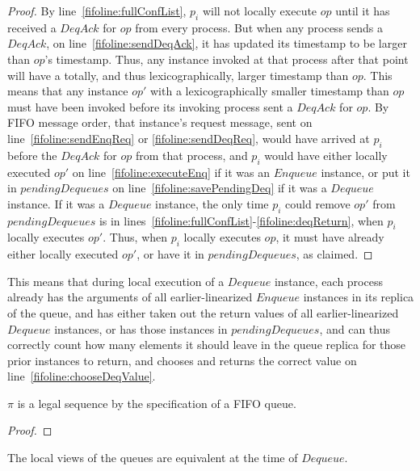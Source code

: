 \documentclass[a4paper,anonymous,USenglish]{lipics-v2021} %
\theoremstyle{definition}
\begin{document}
\begin{proof}
  By line~\ref{fifoline:fullConfList}, $p_i$ will not locally execute $op$ until it has received a $DeqAck$ for $op$ from every process.  But when any process sends a $DeqAck$, on line~\ref{fifoline:sendDeqAck}, it has updated its timestamp to be larger than $op$'s timestamp.  Thus, any instance invoked at that process after that point will have a totally, and thus lexicographically, larger timestamp than $op$.  This means that any instance $op'$ with a lexicographically smaller timestamp than $op$ must have been invoked before its invoking process sent a $DeqAck$ for $op$.  By FIFO message order, that instance's request message, sent on line~\ref{fifoline:sendEnqReq} or \ref{fifoline:sendDeqReq}, would have arrived at $p_i$ before the $DeqAck$ for $op$ from that process, and $p_i$ would have either locally executed $op'$ on line~\ref{fifoline:executeEnq} if it was an $Enqueue$ instance, or put it in $pendingDequeues$ on line~\ref{fifoline:savePendingDeq} if it was a $Dequeue$ instance.  If it was a $Dequeue$ instance, the only time $p_i$ could remove $op'$ from $pendingDequeues$ is in lines~\ref{fifoline:fullConfList}-\ref{fifoline:deqReturn}, when $p_i$ locally executes $op'$.  Thus, when $p_i$ locally executes $op$, it must have already either locally executed $op'$, or have it in $pendingDequeues$, as claimed.
\end{proof}

This means that during local execution of a $Dequeue$ instance, each process already has the arguments of all earlier-linearized $Enqueue$ instances in its replica of the queue, and has either taken out the return values of all earlier-linearized $Dequeue$ instances, or has those instances in $pendingDequeues$, and can thus correctly count how many elements it should leave in the queue replica for those prior instances to return, and chooses and returns the correct value on line~\ref{fifoline:chooseDeqValue}.

\begin{lemma}
  $\pi$ is a legal sequence by the specification of a FIFO queue.
\end{lemma}

\begin{proof}

\end{proof}

\begin{lemma}
  The local views of the queues are equivalent at the time of $Dequeue$.
\end{lemma}
\end{document}
